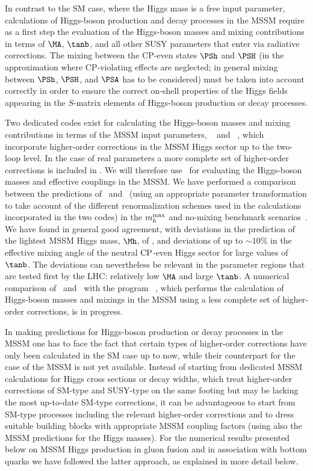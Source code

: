 In contrast to the SM case, where the Higgs mass is a free input
parameter, calculations of Higgs-boson production and decay processes in
the MSSM require as a first step the evaluation of the Higgs-boson
masses and mixing contributions in terms of $\MA$, $\tanb$, and all other
SUSY parameters that enter via radiative corrections. The mixing between
the CP-even states $\PSh$ and $\PSH$ (in the approximation where
CP-violating effects are neglected; in general mixing between $\PSh$,
$\PSH$, and $\PSA$ has to be considered) must be taken into account
correctly in order to ensure the correct on-shell properties of the
Higgs fields appearing in the $S$-matrix elements of Higgs-boson
production or decay processes. 

Two dedicated codes exist for calculating the Higgs-boson masses and
mixing contributions in terms of the MSSM input parameters,
\FeynHiggs~\cite{Heinemeyer:1998yj,Heinemeyer:1998np,Degrassi:2002fi,
Frank:2006yh} and \CPsuperH~\cite{Lee:2003nta,Lee:2007gn}, which
incorporate higher-order corrections in the MSSM Higgs sector up to the
two-loop level. In the case of real parameters a more complete set of
higher-order corrections is included in \FeynHiggs. We will therefore
use \FeynHiggs\ for evaluating the Higgs-boson masses and effective
couplings in the MSSM. We have performed a comparison between the
predictions of \FeynHiggs\ and \CPsuperH\ (using an appropriate
parameter transformation to take account of the different
renormalization schemes used in the calculations incorporated in the two
codes) in the $m_h^{\rm max}$ and no-mixing benchmark
scenarios~\cite{Carena:2002qg,Carena:2000dp}. We have found in general
good agreement, with deviations in the prediction of the lightest MSSM
Higgs mass, $\Mh$, of \UGeV, and deviations of up to $\sim
10\%$ in the effective mixing angle of the neutral $\mathrm{CP}$-even Higgs
sector for large values of $\tanb$.  The deviations can nevertheless be
relevant in the parameter regions that are tested first by the LHC:
relatively low $\MA$ and large $\tanb$.  A numerical comparison of
\FeynHiggs\ and \CPsuperH\ with the program
\HDECAY~\cite{Djouadi:1997yw,Spira:1997dg,hdecay2}, which
performs the calculation of Higgs-boson masses and mixings in the MSSM
using a less complete set of higher-order corrections, is in progress.

In making predictions for Higgs-boson production or decay processes in the MSSM 
one has to face the fact that certain types of higher-order 
corrections have only been calculated in the SM case up to now, while
their counterpart for the case of the MSSM is not yet available. Instead
of starting from dedicated MSSM calculations for Higgs cross sections or
decay widths,  
which treat higher-order corrections of SM-type and SUSY-type on the 
same footing but may be lacking the most up-to-date SM-type corrections,
it can be advantageous to start from SM-type processes including the 
relevant higher-order corrections and to dress suitable building blocks
with appropriate MSSM coupling factors (using also the MSSM predictions
for the Higgs masses). For the numerical results presented below 
on MSSM Higgs production in gluon fusion and in association with bottom
quarks we have followed the latter approach, as explained in more detail
below.


